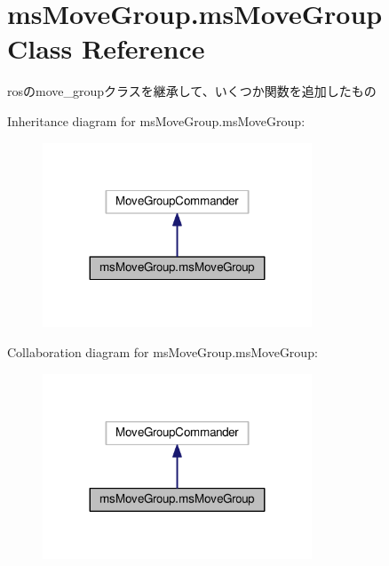 \hypertarget{classmsMoveGroup_1_1msMoveGroup}{}\section{ms\+Move\+Group.\+ms\+Move\+Group Class Reference}
\label{classmsMoveGroup_1_1msMoveGroup}


rosのmove\+\_\+groupクラスを継承して、いくつか関数を追加したもの~\newline
  




Inheritance diagram for ms\+Move\+Group.\+ms\+Move\+Group\+:\nopagebreak
\begin{figure}[H]
\begin{center}
\leavevmode
\includegraphics[width=227pt]{classmsMoveGroup_1_1msMoveGroup__inherit__graph}
\end{center}
\end{figure}


Collaboration diagram for ms\+Move\+Group.\+ms\+Move\+Group\+:\nopagebreak
\begin{figure}[H]
\begin{center}
\leavevmode
\includegraphics[width=227pt]{classmsMoveGroup_1_1msMoveGroup__coll__graph}
\end{center}
\end{figure}
